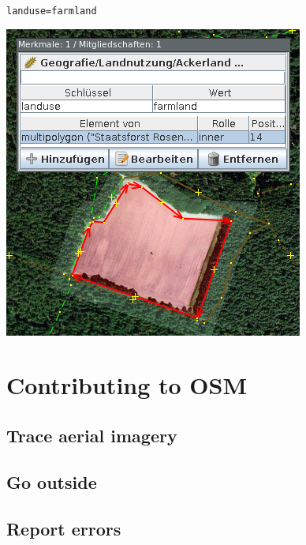 \documentclass{beamer}
\begin{document}
\begin{frame}
\begin{center}
			\begin{minipage}[b][0.6\textheight][c]{0.3\linewidth}
				\texttt{landuse=farmland}
				\begin{center}
					\includegraphics[width=\linewidth,height=\textheight,keepaspectratio]{images/multipolygon_josm.png}
				\end{center}
			\end{minipage}
		\end{center}
	\end{frame}

	\section{Contributing to OSM}
	
	\subsection{Trace aerial imagery}
	
	\subsection{Go outside}
	
	\subsection{Report errors}
	
\end{document}

